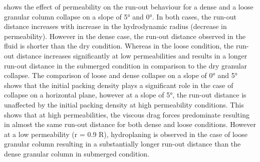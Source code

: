  shows the effect of permeability on the 
run-out behaviour for a dense and a loose granular column collapse on a slope 
of 5\si{\degree} and 0\si{\degree}. In both cases, the run-out distance 
increases with increase in the hydrodynamic radius (decrease in permeability). 
However in the dense case, the run-out distance observed in the fluid is 
shorter than the dry condition. Whereas in the loose condition, the run-out 
distance increases significantly at low permeabilities and results in a longer 
run-out distance in the submerged condition in comparison to the dry granular 
collapse. The comparison of loose and dense collapse on a slope of 
0\si{\degree} and 5\si{\degree} shows that the initial packing density plays a 
significant role in the case of collapse on a horizontal plane, however at a 
slope of 5\si{\degree}, the run-out distance is unaffected by the initial 
packing density at high permeability conditions. This shows that at high 
permeabilities, the viscous drag forces predominate resulting in almost the 
same run-out distance for both dense and loose conditions. However at a low 
permeability (r = 0.9 R), hydroplaning is observed in the case of loose 
granular column resulting in a substantially longer run-out distance than the 
dense granular column in submerged condition. 

